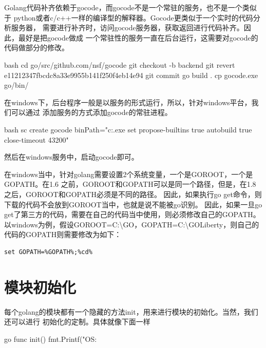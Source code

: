 Golang代码补齐依赖于gocode，而gocode不是一个常驻的服务，也不是一个类似于
python或者c/c++一样的编译型的解释器。Gocode更类似于一个实时的代码分析服务器，
需要进行补齐时，访问gocode服务器，获取返回进行代码补齐。因此，最好是把gocode做成
一个常驻性的服务一直在后台运行，这需要对gocode的代码做部分的修改。
\begin{code-block}{bash}
cd go/src/github.com/nsf/gocode
git checkout -b backend
git revert e11212347fbcdc8a33e9955b141f250f4eb14e94
git commit
go build .
cp gocode.exe go/bin/
\end{code-block}

在windows下，后台程序一般是以服务的形式运行，所以，针对windows平台，我们可以通过
添加服务的方式添加gocode的常驻进程。
\begin{code-block}{bash}
sc create gocode binPath="c:\go\bin\gocode.exe set propose-builtins true autobuild true close-timeout 43200"
\end{code-block}
然后在windows服务中，启动gocode即可。

\begin{attention}
在windows当中，针对golang需要设置2个系统变量，一个是GOROOT，一个是GOPATH。在1.6
之前，GOROOT和GOPATH可以是同一个路径，但是，在1.8之后，GOROOT和GOPATH必须是不同的路径。
因此，如果执行go get命令，则下载的代码不会放到GOROOT当中，也就是说不能被go识别。
因此，如果一旦go get了第三方的代码，需要在自己的代码当中使用，则必须修改自己的GOPATH。
以windows为例，假设GOROOT=C:\textbackslash GO，GOPATH=C:\textbackslash GOLiberty，则自己的代码的GOPATH则需要修改为如下：
\begin{mdframed}[topline=false, bottomline=false, leftline=false, rightline=false, backgroundcolor=lbcolor]
\begin{verbatim}
set GOPATH=%GOPATH%;%cd%
\end{verbatim}
\end{mdframed}
\end{attention}

\section{模块初始化}
每个golang的模块都有一个隐藏的方法init，用来进行模块的初始化。当然，我们还可以进行
初始化的定制。具体就像下面一样
\begin{code-block}{go}
func init() {
    fmt.Printf("OS: %
}
\end{code-block}

